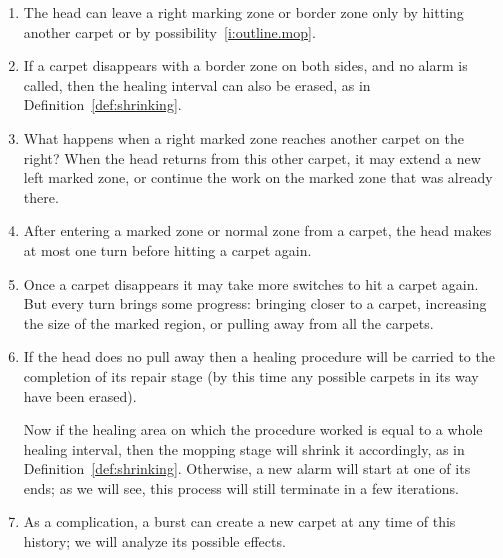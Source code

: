 \documentclass[12pt]{memoir}
\begin{document}
\begin{enumerate}
\item\label{i:outline.leaving-marking}
The head can leave a right marking zone or border zone only by hitting another carpet
or by possibility~\ref{i:outline.mop}.

\item If a carpet disappears with a border zone on both sides, and no alarm
is called, then the healing interval can also be erased, as in Definition~\ref{def:shrinking}.

\item What happens when a right marked zone reaches another carpet on the right?
When the head returns from this other carpet, it may
extend a new left marked zone, or continue the work on the marked zone
that was already there.

\item After entering a marked zone or normal zone from a carpet, the head makes at most one turn
before hitting a carpet again.

\item Once a carpet disappears it may take more switches to hit a carpet again.
But every turn brings some progress: bringing closer to a carpet,
increasing the size of the marked region, or pulling away from all the carpets.

\item\label{i:outline.mop} If the head does no pull away then a 
healing procedure will be carried to the completion of its repair stage (by this time
any possible carpets in its way have been erased).

Now if the healing area on which the procedure worked is equal to a whole healing interval,
then the mopping stage will shrink it accordingly, as in Definition~\ref{def:shrinking}.
Otherwise, a new alarm will start at one of its ends; as we will see, this process
will still terminate in a few iterations.

\item As a complication, a burst can create a new carpet at any time of this history;
we will analyze its possible effects.

\end{enumerate}
\end{document}
